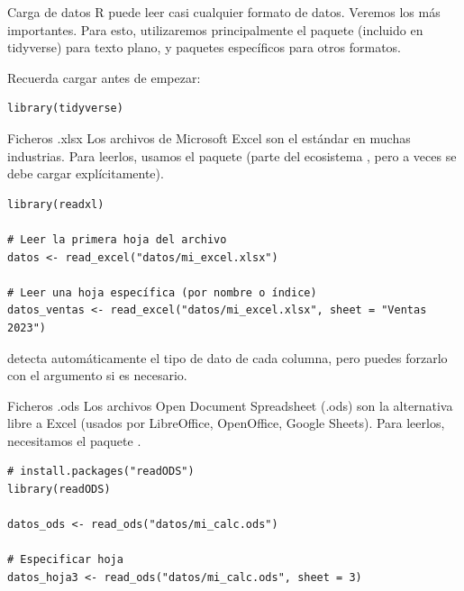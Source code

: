 \documentclass[8pt]{beamer}
\begin{document}
	
	\begin{frame}[fragile]{Carga de datos}
		R puede leer casi cualquier formato de datos. Veremos los más importantes. Para esto, utilizaremos principalmente el paquete  (incluido en tidyverse) para texto plano, y paquetes específicos para otros formatos.
		
		Recuerda cargar  antes de empezar:
\begin{lstlisting}[style=RScript]
library(tidyverse)	
\end{lstlisting}			
	\end{frame}
	

	
	
	\begin{frame}[fragile]{Ficheros .xlsx}
Los archivos de Microsoft Excel son el estándar en muchas industrias. Para leerlos, usamos el paquete  (parte del ecosistema , pero a veces se debe cargar explícitamente).
\begin{lstlisting}[style=RScript]
library(readxl)

# Leer la primera hoja del archivo
datos <- read_excel("datos/mi_excel.xlsx")

# Leer una hoja específica (por nombre o índice)
datos_ventas <- read_excel("datos/mi_excel.xlsx", sheet = "Ventas 2023")	
\end{lstlisting}

 detecta automáticamente el tipo de dato de cada columna, pero puedes forzarlo con el argumento  si es necesario.
	\end{frame}




\begin{frame}[fragile]{Ficheros .ods}
Los archivos Open Document Spreadsheet (.ods) son la alternativa libre a Excel (usados por LibreOffice, OpenOffice, Google Sheets). Para leerlos, necesitamos el paquete .
\begin{lstlisting}[style=RScript]
# install.packages("readODS")
library(readODS)

datos_ods <- read_ods("datos/mi_calc.ods")

# Especificar hoja
datos_hoja3 <- read_ods("datos/mi_calc.ods", sheet = 3)
\end{lstlisting}
\end{frame}
\end{document}
